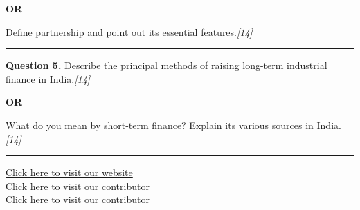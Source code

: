 \documentclass[11pt,a4paper]{article}
\newcommand{\pts}[1]{\hfill   \textit{[#1]}}
\begin{document}
\centerline{   \textbf{OR}}

Define partnership and point out its essential features.\pts{14}

\medskip\rule{\linewidth}{0.2pt}




\noindent   \textbf{Question 5.}
Describe the principal methods of raising long-term industrial finance in India.\pts{14}

\centerline{   \textbf{OR}}

What do you mean by short-term finance? Explain its various sources in India.\pts{14}

\vfill
\rule{\linewidth}{0.4pt}

\begin{center}\small
\href{https://bhu-exam.vercel.app/}{Click here to visit our website}\\[4pt]
\href{https://me-aryan.vercel.app/}{Click here to visit our contributor}\\[4pt]
\href{https://quashan-me.vercel.app/}{Click here to visit our contributor}
\end{center}
\end{document}
